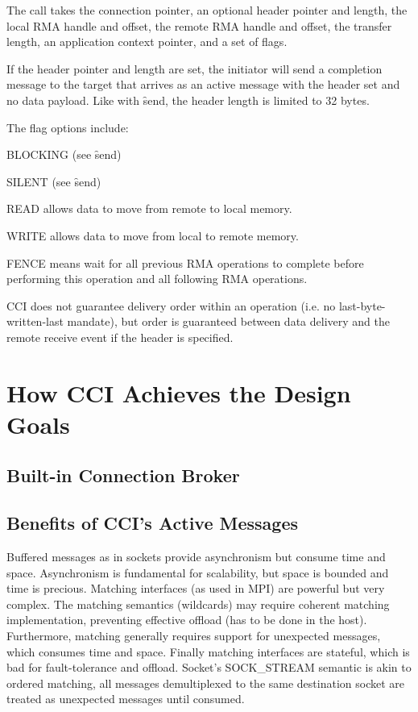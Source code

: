 \documentclass[conference]{IEEEtran}
\begin{document}
The call takes the connection pointer, an optional header pointer and length, the local
RMA handle and offset, the remote RMA handle and offset, the transfer length, an
application context pointer, and a set of flags.

If the header pointer and length are set, the initiator will send a completion message to
the target that arrives as an active message with the header set and no data payload. Like
with \f{send}, the header length is limited to 32 bytes.

The flag options include:

\begin{description}
\item BLOCKING (see \f{send})
\item SILENT (see \f{send})
\item READ allows data to move from remote to local memory.
\item WRITE allows data to move from local to remote memory.
\item FENCE means wait for all previous RMA operations to complete before performing this
operation and all following RMA operations.
\end{description}

CCI does not guarantee delivery order within an operation (i.e. no last-byte-written-last
mandate), but order is guaranteed between data delivery and the remote receive event if
the header is specified.

\section{How CCI Achieves the Design Goals}

\subsection{Built-in Connection Broker}

\subsection{Benefits of CCI's Active Messages}

Buffered messages as in sockets provide asynchronism but consume time and space.
Asynchronism is fundamental for scalability, but space is bounded and time is precious.
Matching interfaces (as used in MPI) are powerful but very complex. The matching semantics
(wildcards) may require coherent matching implementation, preventing effective offload
(has to be done in the host). Furthermore, matching generally requires support for
unexpected messages, which consumes time and space. Finally matching interfaces are
stateful, which is bad for fault-tolerance and offload.  Socket's SOCK\_STREAM semantic is
akin to ordered matching, all messages demultiplexed to the same destination socket are
treated as unexpected messages until consumed.
\end{document}
